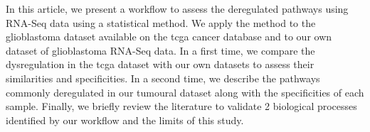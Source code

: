 In this article, we present a workflow to assess the deregulated pathways using RNA-Seq data using a statistical method.
We apply the method to the glioblastoma dataset available on the \acrfull{tcga} cancer database and to our own dataset of glioblastoma RNA-Seq data.
In a first time, we compare the dysregulation in the \acrshort{tcga} dataset with our own datasets to assess their similarities and specificities.
In a second time, we describe the pathways commonly deregulated in our tumoural dataset along with the specificities of each sample.
Finally, we briefly review the literature to validate 2 biological processes identified by our workflow and the limits of this study.
